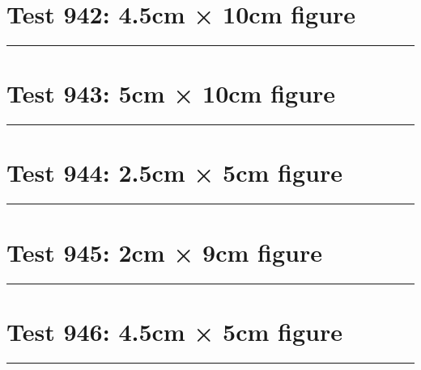 \documentclass[a4paper,11pt]{article}
\begin{document}
\section*{Test 942: 4.5cm × 10cm figure}
\begin{swarmwrap}%
  \begin{minipage}[t]{4cm}
    \centering
    \rule{\linewidth}{10cm}
  \end{minipage}%
\end{swarmwrap}%
\swarmwrapnext
\lipsum[36]
\lipsum[37]
\lipsum[38]
\lipsum[39]
\lipsum[40]
\lipsum[41]
\section*{Test 943: 5cm × 10cm figure}
\begin{swarmwrap}%
  \begin{minipage}[t]{5cm}
    \centering
    \rule{\linewidth}{10cm}
  \end{minipage}%
\end{swarmwrap}%
\swarmwrapnext
\lipsum[46]
\lipsum[47]
\lipsum[48]
\section*{Test 944: 2.5cm × 5cm figure}
\begin{swarmwrap}%
  \begin{minipage}[t]{2cm}
    \centering
    \rule{\linewidth}{5cm}
  \end{minipage}%
\end{swarmwrap}%
\swarmwrapnext
\lipsum[65]
\lipsum[66]
\lipsum[67]
\section*{Test 945: 2cm × 9cm figure}
\begin{swarmwrap}%
  \begin{minipage}[t]{2cm}
    \centering
    \rule{\linewidth}{9cm}
  \end{minipage}%
\end{swarmwrap}%
\swarmwrapnext
\lipsum[94]
\lipsum[95]
\lipsum[96]
\section*{Test 946: 4.5cm × 5cm figure}
\begin{swarmwrap}%
  \begin{minipage}[t]{4cm}
    \centering
    \rule{\linewidth}{5cm}
  \end{minipage}%
\end{swarmwrap}%
\swarmwrapnext
\lipsum[96]
\lipsum[97]
\lipsum[98]
\lipsum[99]
\lipsum[100]
\end{document}
